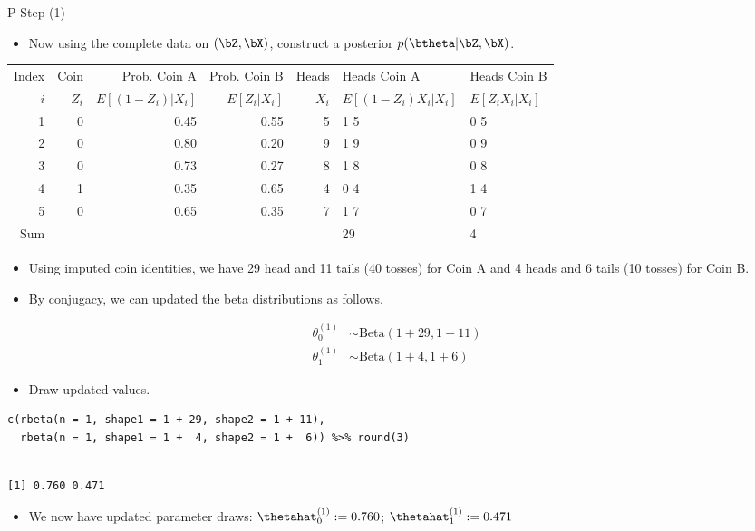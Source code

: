 \documentclass[dvipdfmx,bigger,aspectratio=169]{beamer}
\begin{document}
\begin{frame}[fragile,allowframebreaks,label=,t]{P-Step (1)}
 \begin{itemize}
\item Now using the complete data on \((\bZ,\bX)\), construct a posterior \(p(\btheta | \bZ, \bX)\).
\end{itemize}
\footnotesize
\begin{center}
\begin{tabular}{r|r|rr|r|ll|}
Index & Coin & Prob. Coin A & Prob. Coin B & Heads & Heads Coin A & Heads Coin B\\
\(i\) & \(Z_{i}\) & \(E[(1-Z_{i})\vert X_{i}]\) & \(E[Z_{i}\vert X_{i}]\) & \(X_{i}\) & \(E[(1-Z_{i}) X_{i} \vert X_{i}]\) & \(E[Z_{i} X_{i} \vert X_{i}]\)\\
\hline
1 & 0 & 0.45 & 0.55 & 5 & 1 \texttimes{} 5 & 0 \texttimes{} 5\\
2 & 0 & 0.80 & 0.20 & 9 & 1 \texttimes{} 9 & 0 \texttimes{} 9\\
3 & 0 & 0.73 & 0.27 & 8 & 1 \texttimes{} 8 & 0 \texttimes{} 8\\
4 & 1 & 0.35 & 0.65 & 4 & 0 \texttimes{} 4 & 1 \texttimes{} 4\\
5 & 0 & 0.65 & 0.35 & 7 & 1 \texttimes{} 7 & 0 \texttimes{} 7\\
\hline
Sum &  &  &  &  & 29 & 4\\
\end{tabular}
\end{center}
\normalsize
\begin{itemize}
\item Using imputed coin identities, we have 29 head and 11 tails (40 tosses) for Coin A and 4 heads and 6 tails (10 tosses) for Coin B.
\end{itemize}

\newpage
\begin{itemize}
\item By conjugacy, we can updated the beta distributions as follows.
\end{itemize}
\begin{align*}
  \theta_{0}^{(1)} &\sim \text{Beta}(1 + 29, 1 + 11)\\
  \theta_{1}^{(1)} &\sim \text{Beta}(1 + 4, 1 + 6)
\end{align*}
\begin{itemize}
\item Draw updated values.
\end{itemize}
\tiny
\begin{verbatim}
c(rbeta(n = 1, shape1 = 1 + 29, shape2 = 1 + 11),
  rbeta(n = 1, shape1 = 1 +  4, shape2 = 1 +  6)) %>% round(3)
\end{verbatim}

\begin{verbatim}

[1] 0.760 0.471
\end{verbatim}


\normalsize
\begin{itemize}
\item We now have updated parameter draws: \(\thetahat_{0}^{(1)} := 0.760\); \(\thetahat_{1}^{(1)} := 0.471\)
\end{itemize}
\end{frame}
\end{document}
